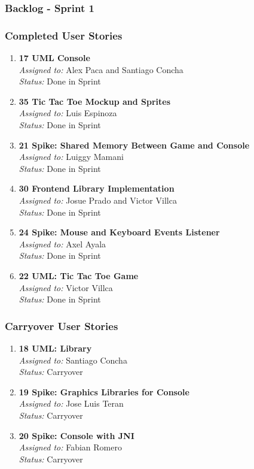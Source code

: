 \subsubsection{Backlog - Sprint 1}

\subsubsection*{Completed User Stories}

\begin{enumerate}
    \item \textbf{17 UML Console} \\
    \textit{Assigned to:} Alex Paca and Santiago Concha \\
    \textit{Status:} Done in Sprint
    \item \textbf{35 Tic Tac Toe Mockup and Sprites} \\
    \textit{Assigned to:} Luis Espinoza \\
    \textit{Status:} Done in Sprint
    \item \textbf{21 Spike: Shared Memory Between Game and Console} \\
    \textit{Assigned to:} Luiggy Mamani \\
    \textit{Status:} Done in Sprint
    \item \textbf{30 Frontend Library Implementation} \\
    \textit{Assigned to:} Josue Prado and Victor Villca\\
    \textit{Status:} Done in Sprint
    \item \textbf{24 Spike: Mouse and Keyboard Events Listener} \\
    \textit{Assigned to:} Axel Ayala \\
    \textit{Status:} Done in Sprint
    \item \textbf{22 UML: Tic Tac Toe Game} \\
    \textit{Assigned to:} Victor Villca\\
    \textit{Status:} Done in Sprint
\end{enumerate}

\subsubsection*{Carryover User Stories}

\begin{enumerate}
    \item \textbf{18 UML: Library} \\
    \textit{Assigned to:} Santiago Concha \\
    \textit{Status:} Carryover 
    \item \textbf{19 Spike: Graphics Libraries for Console} \\
    \textit{Assigned to:} Jose Luis Teran\\
    \textit{Status:} Carryover
    \item \textbf{20 Spike: Console with JNI} \\
    \textit{Assigned to:} Fabian Romero\\
    \textit{Status:} Carryover
\end{enumerate}

